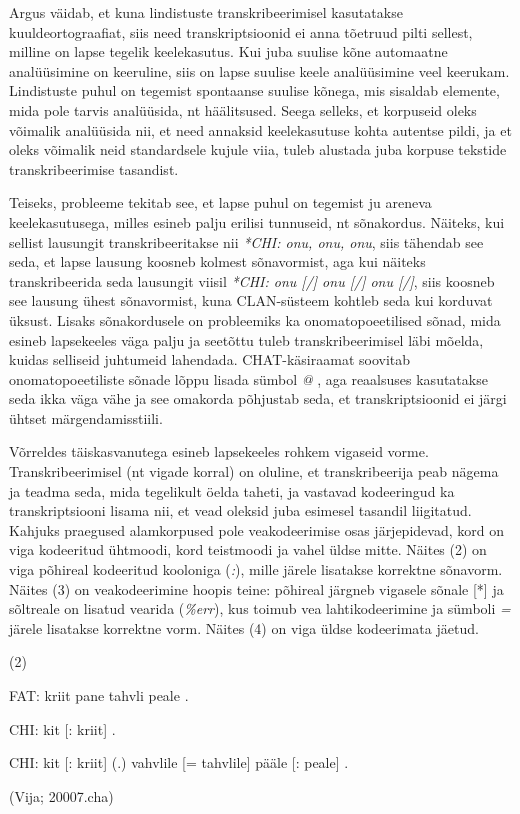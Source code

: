 \documentclass[12pt]{article}
\begin{document}
Argus väidab, et kuna lindistuste transkribeerimisel kasutatakse kuuldeortograafiat, siis need transkriptsioonid ei anna tõetruud pilti sellest, milline on lapse tegelik keelekasutus. Kui juba suulise kõne automaatne analüüsimine on keeruline, siis on lapse suulise keele analüüsimine veel keerukam. Lindistuste puhul on tegemist spontaanse suulise kõnega, mis sisaldab elemente, mida pole tarvis analüüsida, nt häälitsused. Seega selleks, et korpuseid oleks võimalik analüüsida nii, et need annaksid keelekasutuse kohta autentse pildi, ja et oleks võimalik neid standardsele kujule viia, tuleb alustada juba korpuse tekstide transkribeerimise tasandist. \citep[71]{Argus2007}

Teiseks, probleeme tekitab see, et lapse puhul on tegemist ju areneva keelekasutusega, milles esineb palju erilisi tunnuseid, nt sõnakordus. Näiteks, kui sellist lausungit transkribeeritakse nii \emph{*CHI: onu, onu, onu}, siis tähendab see seda, et lapse lausung koosneb kolmest sõnavormist, aga kui näiteks transkribeerida seda lausungit viisil \emph{*CHI: onu [/] onu [/] onu [/]}, siis koosneb see lausung ühest sõnavormist, kuna CLAN-süsteem kohtleb seda kui korduvat üksust. Lisaks sõnakordusele on probleemiks ka onomatopoeetilised sõnad, mida esineb lapsekeeles väga palju ja seetõttu tuleb transkribeerimisel läbi mõelda, kuidas selliseid juhtumeid lahendada. CHAT-käsiraamat soovitab onomatopoeetiliste sõnade lõppu lisada sümbol \emph{@} \citep[72--73]{Argus2007}, aga reaalsuses kasutatakse seda ikka väga vähe ja see omakorda põhjustab seda, et transkriptsioonid ei järgi ühtset märgendamisstiili.

Võrreldes täiskasvanutega esineb lapsekeeles rohkem vigaseid vorme. Transkribeerimisel (nt vigade korral) on oluline, et transkribeerija peab nägema ja teadma seda, mida tegelikult öelda taheti, ja vastavad kodeeringud ka transkriptsiooni lisama nii, et vead oleksid juba esimesel tasandil liigitatud. \citep[74]{Argus2007} Kahjuks praegused alamkorpused pole veakodeerimise osas järjepidevad, kord on viga kodeeritud ühtmoodi, kord teistmoodi ja vahel üldse mitte. Näites (2) on viga põhireal kodeeritud kooloniga (\emph{:}), mille järele lisatakse korrektne sõnavorm. Näites (3) on veakodeerimine hoopis teine: põhireal järgneb vigasele sõnale [*] ja sõltreale on lisatud vearida (\emph{\%err}), kus  toimub vea lahtikodeerimine ja sümboli \emph{=} järele lisatakse korrektne vorm. Näites (4) on viga üldse kodeerimata jäetud.\\
\hfill

(2)
\begin{description}
    \item*FAT: kriit pane tahvli peale .
    \item*CHI: kit [: kriit] .
    \item*CHI: kit [: kriit] (.) vahvlile [= tahvlile] pääle [: peale] .
    \item(Vija; 20007.cha)
\end{description}
\hfill
\end{document}
